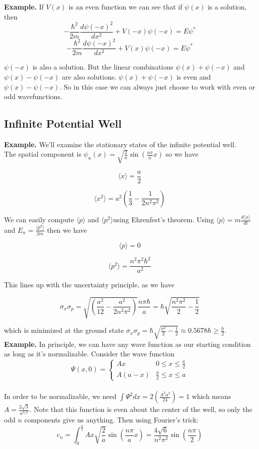 \documentclass[11pt]{article}
\begin{document}
\noindent \textbf{Example.} If \(V(x)\) is an even function we can see that if \(\psi(x)\) is a solution, then
\[
    -\frac{\hbar^2}{2m}\frac{d\psi(-x)^2}{dx^2} + V(-x)\psi(-x) = E\psi^*
\]
\[
    -\frac{\hbar^2}{2m}\frac{d\psi(-x)^2}{dx^2} + V(x)\psi(-x) = E\psi^*
\]

\noindent \(\psi(-x)\) is also a solution. But the linear combinations \(\psi(x) + \psi(-x)\) and \(\psi(x) - \psi(-x)\) are also solutions. \(\psi(x) + \psi(-x)\) is 
even and \(\psi(x) - \psi(-x)\). So in this case we can always just choose to work with even or odd wavefunctions.

\subsection{Infinite Potential Well}
\textbf{Example.} We'll examine the stationary states of the infinite potential well. 
\\
The spatial component is \( \psi_{n}(x) = \sqrt{\frac{2}{a}}\sin{\left( \frac{n\pi}{a}x \right)} \) so we have 

\[ 
    \langle x \rangle = \frac{a}{2}
\]


\[ 
    \langle x^{2} \rangle = a^{2}\left( \frac{1}{3} - \frac{1}{2n^{2}\pi^{2}}\right)
\]

\noindent We can easily compute \( \langle p \rangle \) and \( \langle p^{2} \rangle \)using Ehrenfest's theorem. Using \( \langle p \rangle = m \frac{d\langle x\rangle}{dt} \) and
\( E_{n} = \frac{\langle p^{2} \rangle}{2m} \) then we have


\[ 
    \langle p \rangle = 0 
\]


\[ 
    \langle p^{2} \rangle  = \frac{n^{2} \pi^{2} \hbar^2}{a^{2}}
\]

\noindent This lines up with the uncertainty principle, as we have

\[ 
    \sigma_{x} \sigma_{p} =  \sqrt{ \left(\frac{a^{2}}{12} - \frac{a^{2}}{2n^{2}\pi^{2}} \right) } \frac{n\pi\hbar}{a} = \hbar\sqrt{\frac{n^{2}\pi^{2}}{2} - \frac{1}{2}} 
\]

\noindent which is minimized at the ground state \( \sigma_{x} \sigma_{p} = \hbar \sqrt{\frac{\pi^{2}}{2} - \frac{1}{2}} \approx 0.5678\hbar \geq \frac{\hbar}{2} \).
\\

\noindent \textbf{Example.} In principle, we can have any wave function as our starting condition as long as it's normalizable.
Consider the wave function 
\[
    \Psi(x,0) = 
    \begin{cases}
        Ax & 0 \leq x \leq \frac{a}{2} \\
        A(a - x) & \frac{a}{2} \leq x \leq a 
    \end{cases}  
\]
\\
In order to be normalizable, we need \(\int \Psi^2 dx = 2(\frac{A^2a^3}{24}) = 1\) which means \(A = \frac{2 \sqrt{3} }{ a^{3/2}}\). Note that this function is even about
the center of the well, so only the odd \(n\) components give us anything. Then using Fourier's trick: 
\[
    c_n = \int^{\frac{a}{2}}_0 Ax\sqrt{\frac{2}{a}}\sin{\left(\frac{n\pi}{a}x\right)} = \frac{4 \sqrt{6}}{n^2 \pi^2}\sin{\left(\frac{n\pi}{2}\right)}
\]
\end{document}
